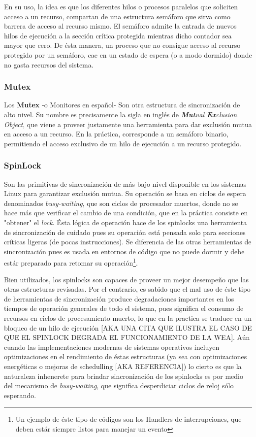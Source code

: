 En su uso, la idea es que los diferentes hilos o procesos paralelos que soliciten acceso a un recurso, compartan de una estructura semáforo que sirva como barrera de acceso al recurso mismo. El semáforo admite la entrada de nuevos hilos de ejecución a la sección crítica protegida mientras dicho contador sea mayor que cero. De ésta manera, un proceso que no consigue acceso al recurso protegido por un semáforo, cae en un estado de espera (o a modo dormido) donde no gasta recursos del sistema.

\subsubsection{Mutex}
Los \textbf{Mutex} -o Monitores en español- Son otra estructura de sincronización de alto nivel. Su nombre es precisamente la sigla en inglés de \emph{\textbf{Mut}ual \textbf{Ex}clusion Object}, que viene a proveer justamente una herramienta para dar exclusión mutua en acceso a un recurso. En la práctica, corresponde a un semáforo binario, permitiendo el acceso exclusivo de un hilo de ejecución a un recurso protegido.

\subsubsection{SpinLock}
Son las primitivas de sincronización de más bajo nivel disponible en los sistemas Linux para garantizar exclusión mutua. Su operación se basa en ciclos de espera denominados \emph{busy-waiting}, que son ciclos de procesador muertos, donde no se hace más que verificar el cambio de una condición, que en la práctica consiste en "obtener" el \emph{lock}. Ésta lógica de operación hace de los spinlocks una herramienta de sincronización de cuidado pues su operación está pensada solo para secciones críticas ligeras (de pocas instrucciones). Se diferencia de las otras herramientas de sincronización pues es usada en entornos de código que no puede dormir y debe estár preparado para retomar su operación\footnote{Un ejemplo de éste tipo de códigos son los Handlers de interrupciones, que deben estár siempre listos para manejar un evento}.

Bien utilizados, los spinlocks son capaces de proveer un mejor desempeño que las otras estructuras revisadas. Por el contrario, es sabido que el mal uso de éste tipo de herramientas de sincronización produce degradaciones importantes en los tiempos de operación generales de todo el sistema, pues significa el consumo de recursos en ciclos de procesamiento muerto, lo que en la practica se traduce en un bloqueo de un hilo de ejecución [AKA UNA CITA QUE ILUSTRA EL CASO DE QUE EL SPINLOCK DEGRADA EL FUNCIONAMIENTO DE LA WEA]. Aún cuando las implementaciones modernas de sistemas operativos incluyen optimizaciones en el rendimiento de éstas estructuras (ya sea con optimizaciones energéticas o mejoras de schedulling [AKA REFERENCIA]) lo cierto es que la naturaleza inhenerete para brindar sincronización de los spinlocks es por medio del mecanismo de \emph{busy-waiting}, que significa desperdiciar ciclos de reloj sólo esperando.

